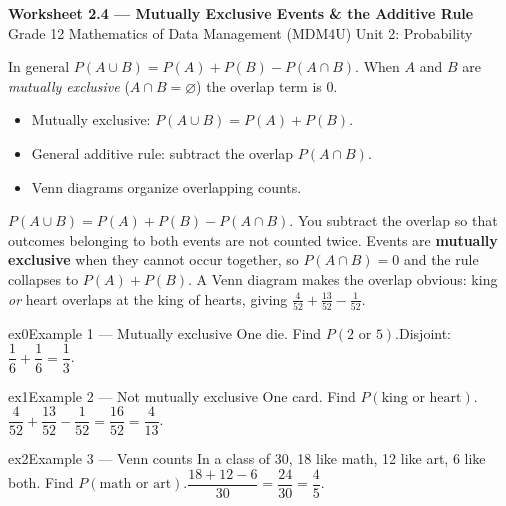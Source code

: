 \documentclass[11pt]{article}
\begin{document}
\begin{center}
{\LARGE\bfseries\color{titleblue}Worksheet 2.4 --- Mutually Exclusive Events \& the Additive Rule}\\[2pt]
{\small Grade 12 Mathematics of Data Management (MDM4U) \textperiodcentered{} Unit 2: Probability}
\end{center}

\begin{ideabox}
In general $P(A\cup B)=P(A)+P(B)-P(A\cap B)$. When $A$ and $B$ are \emph{mutually exclusive} ($A\cap B=\varnothing$) the overlap term is $0$.
\begin{itemize}[leftmargin=*,itemsep=2pt]
  \item Mutually exclusive: $P(A\cup B)=P(A)+P(B)$.
  \item General additive rule: subtract the overlap $P(A\cap B)$.
  \item Venn diagrams organize overlapping counts.
\end{itemize}
\end{ideabox}

\begin{learnbox}
$P(A\cup B)=P(A)+P(B)-P(A\cap B)$. You subtract the overlap so that outcomes belonging to both events are not counted twice.
Events are \textbf{mutually exclusive} when they cannot occur together, so $P(A\cap B)=0$ and the rule collapses to $P(A)+P(B)$.
A Venn diagram makes the overlap obvious: king \emph{or} heart overlaps at the king of hearts, giving $\tfrac{4}{52}+\tfrac{13}{52}-\tfrac{1}{52}$.
\end{learnbox}


\begin{example}{ex0}{Example 1 --- Mutually exclusive}
One die. Find $P(2\text{ or }5)$.\soln Disjoint: $\dfrac16+\dfrac16=\dfrac13$.
\end{example}

\begin{example}{ex1}{Example 2 --- Not mutually exclusive}
One card. Find $P(\text{king or heart})$.\soln $\dfrac{4}{52}+\dfrac{13}{52}-\dfrac{1}{52}=\dfrac{16}{52}=\dfrac{4}{13}$.
\end{example}

\begin{example}{ex2}{Example 3 --- Venn counts}
In a class of 30, 18 like math, 12 like art, 6 like both. Find $P(\text{math or art})$.\soln $\dfrac{18+12-6}{30}=\dfrac{24}{30}=\dfrac45$.
\end{example}
\end{document}

